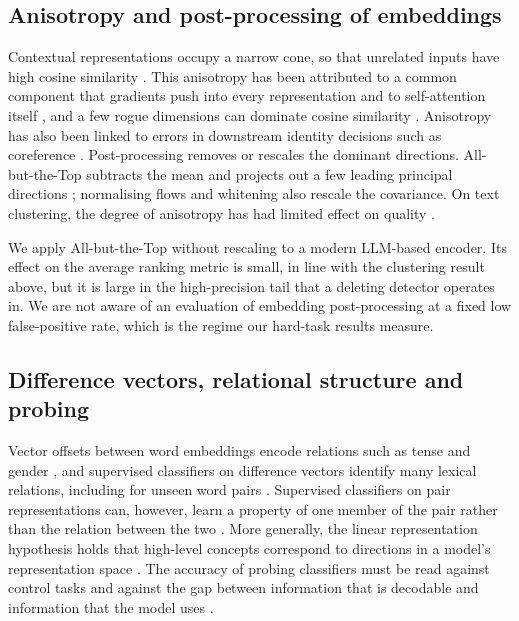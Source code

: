 \documentclass{CUP-JNL-NLP}
\begin{document}
\subsection{Anisotropy and post-processing of embeddings}
\label{sec:related-anisotropy}

Contextual representations occupy a narrow cone, so that unrelated inputs have high cosine similarity \citep{ethayarajh2019contextual}. This anisotropy has been attributed to a common component that gradients push into every representation \citep{bis2021much} and to self-attention itself \citep{godey2024anisotropy}, and a few rogue dimensions can dominate cosine similarity \citep{timkey2021bark}. Anisotropy has also been linked to errors in downstream identity decisions such as coreference \citep{hou2024anisotropic}. Post-processing removes or rescales the dominant directions. All-but-the-Top subtracts the mean and projects out a few leading principal directions \citep{mu2018allbutthetop}; normalising flows \citep{li2020sentence} and whitening \citep{su2021whitening,huang2021whiteningbert} also rescale the covariance. On text clustering, the degree of anisotropy has had limited effect on quality \citep{aitsaada2023anisotropy}.

We apply All-but-the-Top without rescaling to a modern LLM-based encoder. Its effect on the average ranking metric is small, in line with the clustering result above, but it is large in the high-precision tail that a deleting detector operates in. We are not aware of an evaluation of embedding post-processing at a fixed low false-positive rate, which is the regime our hard-task results measure.

\subsection{Difference vectors, relational structure and probing}
\label{sec:related-probing}

Vector offsets between word embeddings encode relations such as tense and gender \citep{mikolov2013linguistic}, and supervised classifiers on difference vectors identify many lexical relations, including for unseen word pairs \citep{vylomova2016take}. Supervised classifiers on pair representations can, however, learn a property of one member of the pair rather than the relation between the two \citep{levy2015supervised}. More generally, the linear representation hypothesis holds that high-level concepts correspond to directions in a model's representation space \citep{park2024linear}. The accuracy of probing classifiers must be read against control tasks \citep{hewitt2019control} and against the gap between information that is decodable and information that the model uses \citep{belinkov2022probing}.
\end{document}
